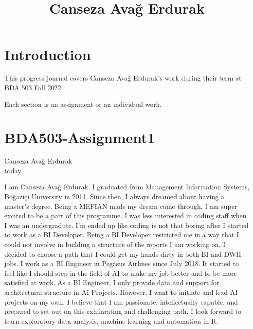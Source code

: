 \documentclass[
  letterpaper,
  DIV=11,
  numbers=noendperiod]{scrreprt}
\title{Canseza Avağ Erdurak}
\author{}
\date{}
\renewcommand*\contentsname{Table of contents}
\newcommand\contentsname{Table of contents}
\begin{document}
\maketitle
\ifdefined\Shaded\renewenvironment{Shaded}{\begin{tcolorbox}[interior hidden, borderline west={3pt}{0pt}{shadecolor}, sharp corners, frame hidden, breakable, enhanced, boxrule=0pt]}{\end{tcolorbox}}\fi

\renewcommand*\contentsname{Table of contents}
{
\hypersetup{linkcolor=}
\setcounter{tocdepth}{2}
\tableofcontents
}

\hypertarget{introduction}{%
\chapter*{Introduction}\label{introduction}}

This progress journal covers Canseza Avağ Erdurak's work during their
term at \href{https://mef-bda503.github.io/fall22/}{BDA 503 Fall 2022}.

Each section is an assignment or an individual work.


\hypertarget{bda503-assignment1}{%
\chapter{BDA503-Assignment1}\label{bda503-assignment1}}

Canseza Avağ Erdurak\\
today

\hfill\break

I am Canseza Avağ Erdurak. I graduated from Management Information
Systems, Boğaziçi University in 2011. Since then, I always dreamed about
having a master's degree. Being a MEFIAN made my dream come through. I
am super excited to be a part of this programme. I was less interested
in coding staff when I was an undergradute. I'm ended up like coding is
not that boring after I started to work as a BI Developer. Being a BI
Developer restricted me in a way that I could not involve in building a
structure of the reports I am working on. I decided to choose a path
that I could get my hands dirty in both BI and DWH jobs. I work as a BI
Engineer in Pegasus Airlines since July 2018. It started to feel like I
should step in the field of AI to make my job better and to be more
satisfied at work. As a BI Engineer, I only provide data and support for
architectural structure in AI Projects. However, I want to initiate and
lead AI projects on my own. I believe that I am passionate,
intellectually capable, and prepared to set out on this exhilarating and
challenging path. I look forward to learn exploratory data analysis,
machine learning and automation in R.
\end{document}
